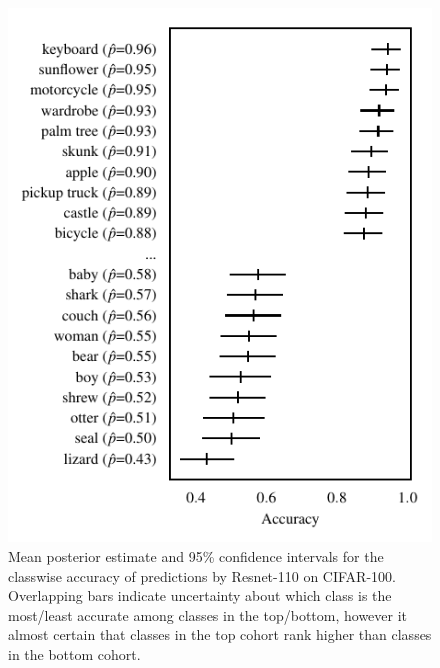 \documentclass{article}
\begin{document}
\begin{figure}[t]
    \centering
    \includegraphics{figures/cifar100_accuracy.pdf}
    \caption{
        Mean posterior estimate and 95\% confidence intervals for the classwise accuracy of predictions by Resnet-110 on CIFAR-100.
        Overlapping bars indicate uncertainty about which class is the most/least accurate among classes in the top/bottom, however it almost certain that classes in the top cohort rank higher than classes in the bottom cohort.
    }
    \label{fig:cifar100_acc}
\end{figure}
\end{document}
